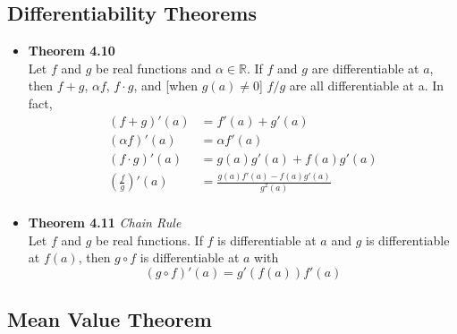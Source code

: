 \documentclass[11pt,a4paper]{article}
\begin{document}
\subsection{Differentiability Theorems}

\begin{itemize}
    \item \textbf{Theorem 4.10} \\
        Let $f$ and $g$ be real functions and $\alpha \in \mathbb{R}$.
        If $f$ and $g$ are differentiable at $a$, then $f+g$, $\alpha f$, $f \cdot g$,
        and [when $g(a) \neq 0$] $f/g$ are all differentiable at a.
        In fact,
        \begin{align*}{}
            (f+g)'(a) &= f'(a) + g'(a) \\
            (\alpha f)'(a) &= \alpha f'(a) \\
            (f \cdot g)'(a) &= g(a) g'(a) + f(a) g'(a) \\
            \left( \frac{f}{g}\right)'(a) &= \frac{g(a) f'(a) - f(a) g'(a)}{g^2(a)} \\
        \end{align*}

    \item \textbf{Theorem 4.11} \emph{Chain Rule} \\
        Let $f$ and $g$ be real functions.
        If $f$ is differentiable at $a$ and $g$ is differentiable at $f(a)$, then
        $g \circ f$ is differentiable at $a$ with
        \[
            (g \circ f)'(a) = g'(f(a))f'(a)
        \]

\end{itemize}

\subsection{Mean Value Theorem}
\end{document}
